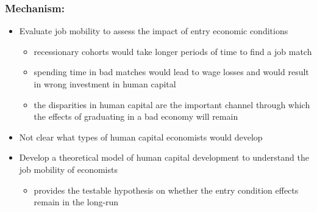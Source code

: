 \documentclass[11pt]{beamer}
\begin{document}
\begin{frame}
	\frametitle{Mechanism: \color{red}{to motivate the model}} 
	\begin{itemize}
		\item Evaluate job mobility to assess the impact of entry economic conditions
		\begin{itemize}
			\item recessionary cohorts would take longer periods of time to find a job match
			\item spending time in bad matches would lead to wage losses and would result in wrong investment in human capital
			\item  the disparities in human capital are the important channel through which the effects of graduating in a bad economy will remain
		\end{itemize}
		\item Not clear what types of human capital economists would develop
		\item Develop a theoretical model of human capital development to understand the job mobility of economists 
		\begin{itemize}
			\item provides the testable hypothesis on whether the entry condition effects remain in the long-run
		\end{itemize}
	\end{itemize}
\end{frame}
\end{document}
